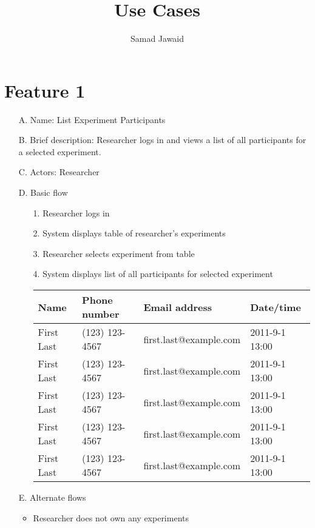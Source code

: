 \documentclass{article}
\title{Use Cases}
\author{Samad Jawaid}
\begin{document}
\maketitle

\section{Feature 1}
\begin{enumerate}
\item[A.] Name: List Experiment Participants
\item[B.] Brief description: Researcher logs in and views a list of all participants for a selected experiment.
\item[C.] Actors: Researcher
\item[D.] Basic flow
    \begin{enumerate}
    \item[1.] Researcher logs in
    \item[2.] System displays table of researcher's experiments
    \item[3.] Researcher selects experiment from table
    \item[4.] System displays list of all participants for selected experiment
        \begin{table}
            \begin{tabular}{|l|l|l|l|}
                \hline
                Name       & Phone number   & Email address          & Date/time      \\ \hline
                First Last & (123) 123-4567 & first.last@example.com & 2011-9-1 13:00 \\
                First Last & (123) 123-4567 & first.last@example.com & 2011-9-1 13:00 \\
                First Last & (123) 123-4567 & first.last@example.com & 2011-9-1 13:00 \\
                First Last & (123) 123-4567 & first.last@example.com & 2011-9-1 13:00 \\
                First Last & (123) 123-4567 & first.last@example.com & 2011-9-1 13:00 \\
                \hline
            \end{tabular}
        \end{table}
    \end{enumerate}
\item[E.] Alternate flows
    \begin{itemize}
    \item Researcher does not own any experiments

\end{itemize}
\end{enumerate}
\end{document}
